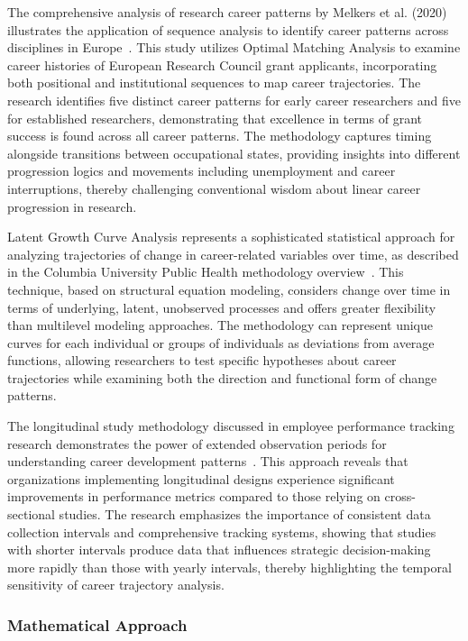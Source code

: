 \documentclass[main.tex]{subfiles}
\begin{document}
The comprehensive analysis of research career patterns by Melkers et al. (2020) illustrates the application of sequence analysis to identify career patterns across disciplines in Europe~\parencite{career_patterns_europe}. This study utilizes Optimal Matching Analysis to examine career histories of European Research Council grant applicants, incorporating both positional and institutional sequences to map career trajectories. The research identifies five distinct career patterns for early career researchers and five for established researchers, demonstrating that excellence in terms of grant success is found across all career patterns. The methodology captures timing alongside transitions between occupational states, providing insights into different progression logics and movements including unemployment and career interruptions, thereby challenging conventional wisdom about linear career progression in research.

Latent Growth Curve Analysis represents a sophisticated statistical approach for analyzing trajectories of change in career-related variables over time, as described in the Columbia University Public Health methodology overview~\parencite{latent_growth_columbia}. This technique, based on structural equation modeling, considers change over time in terms of underlying, latent, unobserved processes and offers greater flexibility than multilevel modeling approaches. The methodology can represent unique curves for each individual or groups of individuals as deviations from average functions, allowing researchers to test specific hypotheses about career trajectories while examining both the direction and functional form of change patterns.

The longitudinal study methodology discussed in employee performance tracking research demonstrates the power of extended observation periods for understanding career development patterns~\parencite{longitudinal_psico}. This approach reveals that organizations implementing longitudinal designs experience significant improvements in performance metrics compared to those relying on cross-sectional studies. The research emphasizes the importance of consistent data collection intervals and comprehensive tracking systems, showing that studies with shorter intervals produce data that influences strategic decision-making more rapidly than those with yearly intervals, thereby highlighting the temporal sensitivity of career trajectory analysis.

\subsubsection{Mathematical Approach}
\end{document}
